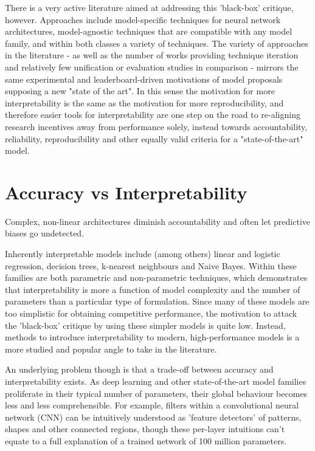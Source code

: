 \documentclass[main]{subfiles}
\begin{document}
There is a very active literature aimed at addressing this 'black-box' critique, however. Approaches include model-specific techniques for neural network architectures, model-agnostic techniques that are compatible with any model family, and within both classes a variety of techniques. The variety of approaches in the literature - as well as the number of works providing technique iteration and relatively few unification or evaluation studies in comparison - mirrors the same experimental and leaderboard-driven motivations of model proposals supposing a new "state of the art". In this sense the motivation for more interpretability is the same as the motivation for more reproducibility, and therefore easier tools for interpretability are one step on the road to re-aligning research incentives away from performance solely, instead towards accountability, reliability, reproducibility and other equally valid criteria for a "state-of-the-art" model.


\section{Accuracy vs Interpretability}

Complex, non-linear architectures diminish accountability and often let predictive biases go undetected.

Inherently interpretable models include (among others) linear and logistic regression, decision trees, k-nearest neighbours and Naive Bayes. Within these families are both parametric and non-parametric techniques, which demonstrates that interpretability is more a function of model complexity and the number of parameters than a particular type of formulation. Since many of these models are too simplistic for obtaining competitive performance, the motivation to attack the 'black-box' critique by using these simpler models is quite low. Instead, methods to introduce interpretability to modern, high-performance models is a more studied and popular angle to take in the literature. 

An underlying problem though is that a trade-off between accuracy and interpretability exists. As deep learning and other state-of-the-art model families proliferate in their typical number of parameters, their global behaviour becomes less and less comprehensible. For example, filters within a convolutional neural network (CNN) can be intuitively understood as 'feature detectors' of patterns, shapes and other connected regions, though these per-layer intuitions can't equate to a full explanation of a trained network of 100 million parameters.
\end{document}
